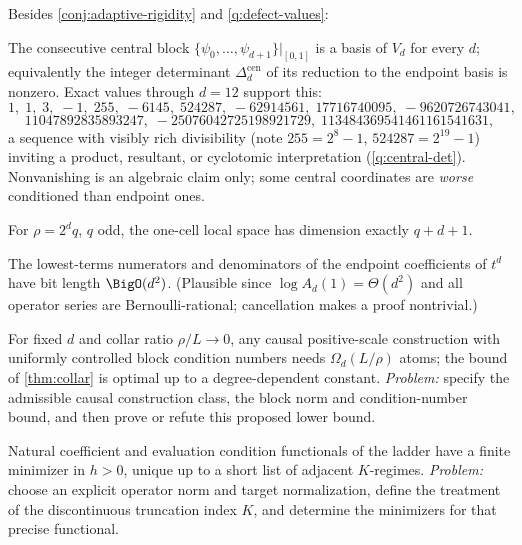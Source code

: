 \documentclass[11pt,oneside]{article}
\numberwithin{equation}{section}
\theoremstyle{definition}
\theoremstyle{remark}
\begin{document}
Besides \cref{conj:adaptive-rigidity} and
\cref{q:defect-values}:

\begin{conjecture}
\label{conj:central-basis}
The consecutive central block
$\{\psi_0,\dots,\psi_{d+1}\}|_{[0,1]}$ is a basis of $V_d$ for every
$d$; equivalently the integer determinant
$\Delta^{\mathrm{cen}}_d$ of its reduction to the endpoint basis is
nonzero.  Exact values through $d=12$ support this:
\[
 1,\;1,\;3,\;-1,\;255,\;-6145,\;524287,\;-62914561,\;
 17716740095,\;-9620726743041,
\]
\[
 11047892835893247,\;-25076042725198921729,\;
 113484369541461161541631,
\]
a sequence with visibly rich divisibility (note
$255=2^{8}-1$, $524287=2^{19}-1$) inviting a product, resultant, or
cyclotomic interpretation (\cref{q:central-det}).  Nonvanishing is an
algebraic claim only; some central coordinates are \emph{worse}
conditioned than endpoint ones.
\end{conjecture}

\begin{conjecture}
\label{conj:odd-dim}
For $\rho=2^{d}q$, $q$ odd, the one-cell local space has dimension
exactly $q+d+1$.
\end{conjecture}

\begin{conjecture}
\label{conj:bit-growth}
The lowest-terms numerators and denominators of the endpoint
coefficients of $t^{d}$ have bit length $\BigO(d^{2})$.  (Plausible
since $\log A_d(1)=\Theta(d^{2})$ and all operator series are
Bernoulli-rational; cancellation makes a proof nontrivial.)
\end{conjecture}

\begin{problem}
\label{prob:pareto}
For fixed $d$ and collar ratio $\rho/L\to0$, any causal
positive-scale construction with uniformly controlled block condition
numbers needs $\Omega_d(L/\rho)$ atoms; the bound of
\cref{thm:collar} is optimal up to a degree-dependent constant.
\emph{Problem:} specify the admissible causal construction class, the block
norm and condition-number bound, and then prove or refute this proposed lower
bound.
\end{problem}

\begin{problem}
\label{prob:conditioning-scale}
Natural coefficient and evaluation condition functionals of the
ladder have a finite minimizer in $h>0$, unique up to a short list of
adjacent $K$-regimes.
\emph{Problem:} choose an explicit operator norm and target normalization,
define the treatment of the discontinuous truncation index $K$, and determine
the minimizers for that precise functional.
\end{problem}
\end{document}
